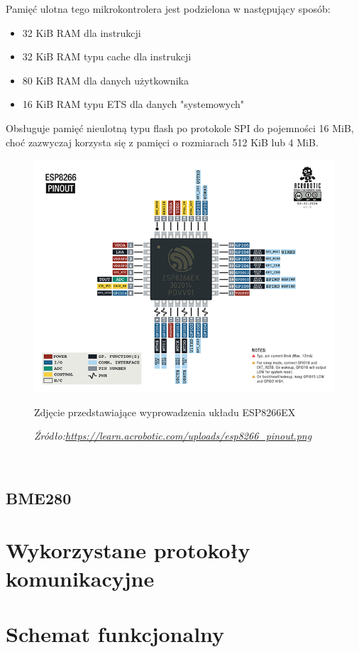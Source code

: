 \documentclass[12pt,a4paper,oneside]{memoir}
\begin{document}
Pamięć ulotna tego mikrokontrolera jest podzielona w następujący sposób:
\begin{itemize}
	\item 32 KiB RAM dla instrukcji
	\item 32 KiB RAM typu cache dla instrukcji
	\item 80 KiB RAM dla danych użytkownika
	\item 16 KiB RAM typu ETS dla danych "systemowych"
\end{itemize}
Obsługuje pamięć nieulotną typu flash po protokole SPI do pojemności 16 MiB, choć zazwyczaj korzysta się z pamięci o rozmiarach 512 KiB lub 4 MiB.\\
\begin{figure}[h]
	\includegraphics[scale=1.5]{images/esp8266_pinout.png}
	{\tytulyrozdzialow \footnotesize \caption[ESP8266EX]{Zdjęcie przedstawiające wyprowadzenia układu ESP8266EX}}
	\caption*{\textit{Źródło:\url{https://learn.acrobotic.com/uploads/esp8266_pinout.png}}}
\end{figure}\\
\newpage
\section{BME280}
\newpage
\chapter{Wykorzystane protokoły komunikacyjne}
\newpage
\chapter{Schemat funkcjonalny}
\end{document}
